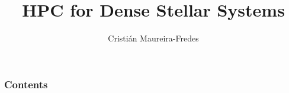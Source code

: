 \documentclass{beamer}
\author[C. Maureira-Fredes]
       {\large Cristián Maureira-Fredes}
\title[HPC DSS]
      {\huge HPC for Dense Stellar Systems}
\institute[AEI]
          {Albert Einstein Institute}
\begin{document}
%

\begin{frame}[t,plain]
    \titlepage
\end{frame}

\begin{frame}
    \frametitle{Contents}
    \tableofcontents
\end{frame}





\begin{frame}[t,plain]
\titlepage
\end{frame}

\begin{frame}[allowframebreaks]
\footnotesize

\end{frame}
\end{document}
